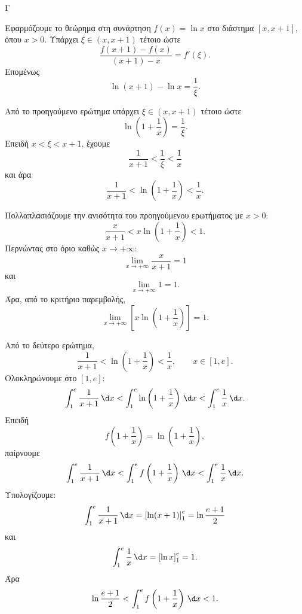 \begin{thema}{Γ}
\begin{erwthma}
\item Εφαρμόζουμε το θεώρημα  στη συνάρτηση $f(x)=\ln x$ στο διάστημα $[x,x+1]$, όπου $x>0$.
Υπάρχει $\xi\in(x,x+1)$ τέτοιο ώστε
\[
\frac{f(x+1)-f(x)}{(x+1)-x}=f'(\xi).
\]
Επομένως
\[
\ln(x+1)-\ln x=\frac{1}{\xi}.
\]

\item Από το προηγούμενο ερώτημα υπάρχει $\xi\in(x,x+1)$ τέτοιο ώστε
\[
\ln\left(1+\frac{1}{x}\right)=\frac{1}{\xi}.
\]
Επειδή $x<\xi<x+1$, έχουμε
\[
\frac{1}{x+1}<\frac{1}{\xi}<\frac{1}{x}
\]
και άρα
\[
\frac{1}{x+1}<\ln\left(1+\frac{1}{x}\right)<\frac{1}{x}.
\]

\item Πολλαπλασιάζουμε την ανισότητα του προηγούμενου ερωτήματος με $x>0$:
\[
\frac{x}{x+1}<x\ln\left(1+\frac{1}{x}\right)<1.
\]
Περνώντας στο όριο καθώς $x\to +\infty$:
\[
\lim_{x\to +\infty}\frac{x}{x+1}=1
\]
και
\[
\lim_{x\to +\infty}1=1.
\]
Άρα, από το κριτήριο παρεμβολής,
\[
\lim_{x\to +\infty}\left[x\ln\left(1+\frac{1}{x}\right)\right]=1.
\]

\item Από το δεύτερο ερώτημα,
\[
\frac{1}{x+1}<\ln\left(1+\frac{1}{x}\right)<\frac{1}{x},\qquad x\in[1,e].
\]
Ολοκληρώνουμε στο $[1,e]$:
\[
\int_1^e \frac{1}{x+1}\,\d x
<
\int_1^e \ln\left(1+\frac{1}{x}\right)\,\d x
<
\int_1^e \frac{1}{x}\,\d x.
\]
Επειδή
\[
f\left(1+\frac{1}{x}\right)=\ln\left(1+\frac{1}{x}\right),
\]
παίρνουμε
\[
\int_1^e \frac{1}{x+1}\,\d x
<
\int_1^e f\left(1+\frac{1}{x}\right)\,\d x
<
\int_1^e \frac{1}{x}\,\d x.
\]
Υπολογίζουμε:
\[
\int_1^e \frac{1}{x+1}\,\d x
=
\left[\ln(x+1)\right]_1^e
=
\ln\frac{e+1}{2}
\]
και
\[
\int_1^e \frac{1}{x}\,\d x
=
\left[\ln x\right]_1^e
=1.
\]
Άρα
\[
\ln\frac{e+1}{2}
<
\int_1^e f\left(1+\frac{1}{x}\right)\,\d x
<
1.
\]
\end{erwthma}
\end{thema}
